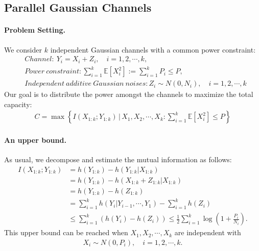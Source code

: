 \documentclass{article}
\numberwithin{equation}{section}
\newcommand{\E}{\mathbb{E}}
\theoremstyle{plain}
\theoremstyle{definition}
\begin{document}
\subsection{Parallel Gaussian Channels}
\paragraph{Problem Setting.} We consider $k$ independent Gaussian channels with a common power constraint:
\begin{align*}
	&Channel:\ Y_i=X_i+Z_i,\quad i=1,2,\cdots,k,\\
	&Power\ constraint: \sum_{i=1}^k \E[X_i^2]:=\sum_{i=1}^k P_i\leq P,\\
	&Independent\ additive\ Gaussian\ noises: Z_i\sim N(0,N_i),\quad i=1,2,\cdots,k
\end{align*}
Our goal is to distribute the power amongst the channels to maximize the total capacity:
\begin{align*}
	C=\max\left\{I(X_{1:k};Y_{1:k})\,\bigg|\, X_1,X_2,\cdots,X_k:\sum_{i=1}^k\E[X_i^2]\leq P\right\}
\end{align*}
\paragraph{An upper bound.} As usual, we decompose and estimate the mutual information as follows:
\begin{align*}
	I(X_{1:k};Y_{1:k})&=h(Y_{1:k})-h(Y_{1:k}|X_{1:k})\\
	&=h(Y_{1:k})-h(X_{1:k}+Z_{1:k}|X_{1:k})\\
	&=h(Y_{1:k})-h(Z_{1:k})\\
	&=\sum_{i=1}^k h(Y_i|Y_{i-1},\cdots,Y_1)-\sum_{i=1}^k h(Z_i)\\
	&\leq\sum_{i=1}^k\left(h(Y_i)-h(Z_i)\right)\leq\frac{1}{2}\sum_{i=1}^k\log\left(1+\frac{P_i}{N_i}\right).
\end{align*}
This upper bound can be reached when $X_1,X_2,\cdots,X_k$ are independent with
\begin{align*}
	X_i\sim N(0,P_i),\quad i=1,2,\cdots,k.
\end{align*}
\end{document}
